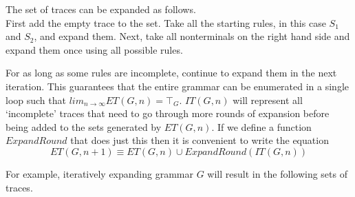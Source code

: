 \documentclass[a4paper,11pt]{article}
\begin{document}
The set of traces can be expanded as follows.\\
First add the empty trace to the set. 
Take all the starting rules, in this case $S_1$ and $S_2$, and expand them.
Next, take all nonterminals on the right hand side and expand them once using all possible rules. 

For as long as some rules are incomplete, continue to expand them in the next iteration. This guarantees that the entire grammar can be enumerated in a single loop such that $lim_{n \to \infty} ET(G,n) = \top_{G}$.
$IT(G, n)$ will represent all `incomplete' traces that need to go through more rounds of expansion before being added to the sets generated by $ET(G, n)$.
If we define a function $ExpandRound$ that does just this then it is convenient to write the equation 
\begin{equation} ET(G, n+1) \equiv ET(G, n) \cup ExpandRound(IT(G, n)) \end{equation}

For example, iteratively expanding grammar $G$ will result in the following sets of traces.
\end{document}
